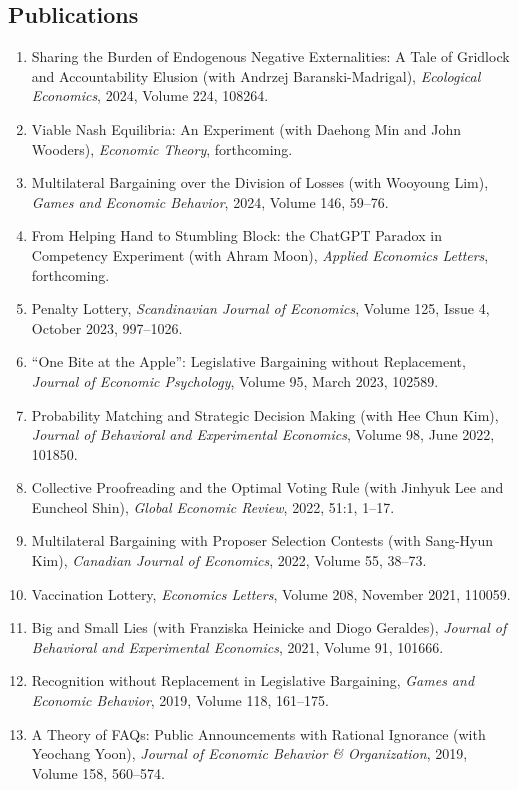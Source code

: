 \documentclass[margin, a4paper]{res}
\begin{document}
\begin{resume}
\section{Publications}
\begin{enumerate}[leftmargin=*]
\item Sharing the Burden of Endogenous Negative Externalities: A Tale of Gridlock and Accountability Elusion (with Andrzej Baranski-Madrigal), \emph{Ecological Economics}, 2024, Volume 224, 108264.
\item Viable Nash Equilibria: An Experiment (with Daehong Min and John Wooders), \emph{Economic Theory}, forthcoming.
\item Multilateral Bargaining over the Division of Losses (with Wooyoung Lim), \emph{Games and Economic Behavior}, 2024, Volume 146, 59--76.
\item From Helping Hand to Stumbling Block: the ChatGPT Paradox in Competency Experiment (with Ahram Moon), \emph{Applied Economics Letters}, forthcoming.
\item Penalty Lottery, \emph{Scandinavian Journal of Economics}, Volume 125, Issue 4, October 2023, 997--1026.
\item ``One Bite at the Apple'': Legislative Bargaining without Replacement, \emph{Journal of Economic Psychology}, Volume 95, March 2023, 102589.
\item Probability Matching and Strategic Decision Making (with Hee Chun Kim), \emph{Journal of Behavioral and Experimental Economics}, Volume 98, June 2022, 101850.
\item Collective Proofreading and the Optimal Voting Rule (with Jinhyuk Lee and Euncheol Shin), \emph{Global Economic Review}, 2022, 51:1, 1--17.
\item Multilateral Bargaining with Proposer Selection Contests (with Sang-Hyun Kim), \emph{Canadian Journal of Economics}, 2022, Volume 55, 38--73.
\item Vaccination Lottery, \emph{Economics Letters}, Volume 208, November 2021, 110059.
\item Big and Small Lies (with Franziska Heinicke and Diogo Geraldes), \emph{Journal of Behavioral and Experimental Economics}, 2021, Volume 91, 101666.
\item Recognition without Replacement in Legislative Bargaining, \emph{Games and Economic Behavior}, 2019, Volume 118, 161--175.
\item A Theory of FAQs: Public Announcements with Rational Ignorance (with Yeochang Yoon), \emph{Journal of Economic Behavior \& Organization}, 2019, Volume 158, 560--574.

\end{enumerate}
\end{resume}
\end{document}
